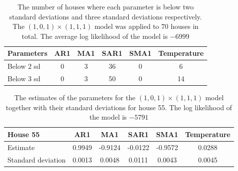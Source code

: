\begin{table}[]
    \centering
    \begin{tabular}{l|ccccc}
    \hline
    \textbf{Parameters} & \textbf{AR1} & \textbf{MA1} & \textbf{SAR1} & \textbf{SMA1} & \textbf{Temperature} \\ \hline \hline
    Below 2 sd & 0   & 3   & 36   & 0    & 6           \\ 
    Below 3 sd & 0   & 3   & 50   & 0    & 14          \\ \hline
    \end{tabular}
    \caption{The number of houses where each parameter is below two standard deviations and three standard deviations respectively. The $(1,0,1)\times (1,1,1)$ model was applied to $70$ houses in total. The average log likelihood of the model is $-6999$}
    \label{tab:ParamSig_Model1}
\end{table}

\begin{table}[]
    \centering
    \begin{tabular}{l|ccccc}
    \hline
    \textbf{House 55} & \textbf{AR1} & \textbf{MA1} & \textbf{SAR1} & \textbf{SMA1} & \textbf{Temperature} \\ \hline \hline
    Estimate           & 0.9949 & -0.9124 & -0.0122 & -0.9572 & 0.0288      \\ 
    Standard deviation & 0.0013 & 0.0048  & 0.0111  & 0.0043  & 0.0045      \\ \hline
    \end{tabular}
    \caption{The estimates of the parameters for the $(1,0,1)\times (1,1,1)$ model together with their standard deviations for house 55. The log likelihood of the model is $-5791$}
    \label{tab:ParamSig_House55}
 \end{table}

